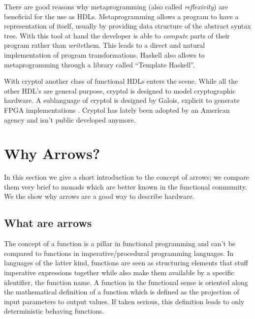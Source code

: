 \documentclass[9pt,final,a4paper,leqno]{article}
\begin{document}
\par
There are good reasons why metaprogramming (also called \emph{reflexivity}) are beneficial for the use as HDLs. Metaprogramming allows a
program to have a representation of itself, usually by providing data structure of the abstract syntax tree. With this tool at hand the
developer is able to \emph{compute} parts of their program rather than \emph{write}them. This leads to a direct and natural implementation
of program transformations. Haskell also allows to metaprogramming through a library called ``Template Haskell''\cite{haskell:template}. 

\par
With cryptol\cite{cryptol:programming} another class of functional HDLs enters the scene. While all the other HDL's are general purpose,
cryptol is designed to model cryptographic hardware. A sublanguage of cryptol is designed by Galois, explicit to generate FPGA
implementations \cite{cryptol:fpga}. Cryptol has lately been adopted by an American agency and isn't public developed anymore.


\section{Why Arrows?}
In this section we give a short introduction to the concept of arrows; we compare them very brief to monads which are better known in the
functional community. We the show why arrows are a good way to describe hardware. 

\subsection{What are arrows}
The concept of a function is a pillar in functional programming and can't be compared to functions in imperative/procedural programming
languages. In languages of the latter kind, functions are seen as structuring elements that stuff imperative expressions together while also
make them available by a specific identifier, the function name. A function in the functional sense is oriented along the mathematical
definition of a function which is defined as the projection of input parameters to output values. If taken serious, this definition leads
to only deterministic behaving functions.  
\end{document}
